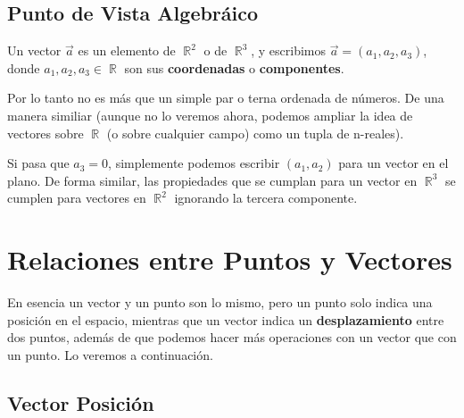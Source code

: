 \documentclass[12pt, fleqn]{report}                             %
\theoremstyle{break}                                            %
\DeclareMathOperator \Reals        {\mathbb{R}}                 %
\begin{document}
            \subsection{Punto de Vista Algebráico}
            
                Un vector $\vec{a}$ es un elemento de $\Reals^2$ o de $\Reals^3$, y escribimos
                $\vec{a} = (a_1, a_2, a_3)$, donde $a_1, a_2, a_3 \in \Reals$ son sus
                \textbf{coordenadas} o \textbf{componentes}.

                Por lo tanto no es más que un simple par o terna ordenada de números. 
                De una manera similiar (aunque no lo veremos ahora, podemos ampliar la idea de vectores
                sobre $\Reals$ (o sobre cualquier campo) como un tupla de n-reales).

                Si pasa que $a_3 = 0$, simplemente podemos escribir $(a_1, a_2)$ para un vector en el plano.
                De forma similar, las propiedades que se cumplan para un vector en $\Reals^3$ se
                cumplen para vectores en $\Reals^2$ ignorando la tercera componente.

            
        \clearpage
        \section{Relaciones entre Puntos y Vectores}
        
            En esencia un vector y un punto son lo mismo, pero un punto solo indica una posición
            en el espacio, mientras que un vector indica un \textbf{desplazamiento} entre dos puntos, además de que podemos hacer más operaciones con un vector que con un punto.
            Lo veremos a continuación.
            
            \subsection{Vector Posición}
            
\end{document}
